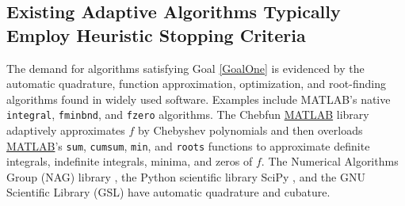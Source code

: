 \documentclass[11pt]{NSFamsart}
\newcommand{\MATLAB}{\hyperlink{MATLABlink}{MATLAB}\xspace}
\begin{document}
\subsection{Existing Adaptive Algorithms Typically Employ Heuristic Stopping Criteria} \label{sec:Heuristics}

The demand for algorithms satisfying Goal \ref{GoalOne} is evidenced by the automatic quadrature, function approximation, optimization, and root-finding algorithms found in widely used software.  Examples include \hypertarget{MATLABlink}{MATLAB}'s \cite{MAT9.5} native \texttt{integral}, \texttt{fminbnd}, and \texttt{fzero} algorithms.  The \hypertarget{Chebfunlink}{Chebfun} \MATLAB library \cite{TrefEtal17a} adaptively approximates $f$ by Chebyshev polynomials and then overloads \MATLAB's \texttt{sum}, \texttt{cumsum}, \texttt{min}, and \texttt{roots} functions to approximate definite integrals, indefinite integrals, minima, and zeros of $f$.  The  Numerical Algorithms Group
(\hypertarget{NAGlink}{NAG}) library \citep{NAG23}, the Python scientific library \hypertarget{SciPylink}{SciPy} \cite{SCIPY}, and the GNU Scientific Library (\hypertarget{GSLlink}{GSL}) \cite{GSL} have automatic quadrature and cubature. 
\end{document}

